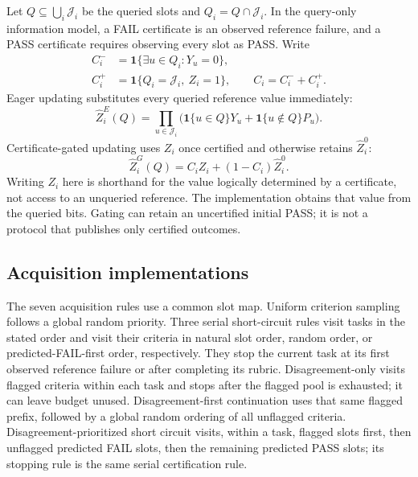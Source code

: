 Let $Q\subseteq\bigcup_i\mathcal J_i$ be the queried slots and
$Q_i=Q\cap\mathcal J_i$. In the query-only information model, a FAIL
certificate is an observed reference failure, and a PASS certificate requires
observing every slot as PASS. Write
\begin{align}
 C_i^-&=\mathbf1\{\exists u\in Q_i:Y_u=0\},\\
 C_i^+&=\mathbf1\{Q_i=\mathcal J_i,\ Z_i=1\},
 \qquad C_i=C_i^-+C_i^+.
 \label{app:eq:certificates}
\end{align}
Eager updating substitutes every queried reference value immediately:
\begin{equation}
 \widehat Z_i^{E}(Q)
 =\prod_{u\in\mathcal J_i}
       \bigl(\mathbf1\{u\in Q\}Y_u+\mathbf1\{u\notin Q\}P_u\bigr).
 \label{app:eq:eager}
\end{equation}
Certificate-gated updating uses $Z_i$ once certified and otherwise retains
$\widehat Z_i^0$:
\begin{equation}
 \widehat Z_i^{G}(Q)=C_iZ_i+(1-C_i)\widehat Z_i^0.
 \label{app:eq:gated}
\end{equation}
Writing $Z_i$ here is shorthand for the value logically determined by a
certificate, not access to an unqueried reference. The implementation obtains
that value from the queried bits. Gating can retain an uncertified initial
PASS; it is not a protocol that publishes only certified outcomes.

\subsection{Acquisition implementations}
\label{app:acquisition}

The seven acquisition rules use a common slot map. Uniform criterion
sampling follows a global random priority. Three serial short-circuit rules
visit tasks in the stated order and visit their criteria in natural slot
order, random order, or predicted-FAIL-first order, respectively. They stop
the current task at its first observed reference failure or after completing
its rubric. Disagreement-only visits flagged criteria within each task and
stops after the flagged pool is exhausted; it can leave budget unused.
Disagreement-first continuation uses that same flagged prefix, followed by a global
random ordering of all unflagged criteria. Disagreement-prioritized short
circuit visits, within a task, flagged slots first, then unflagged predicted
FAIL slots, then the remaining predicted PASS slots; its stopping rule is
the same serial certification rule.

